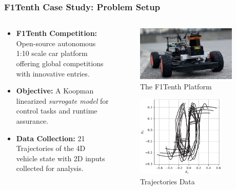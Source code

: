 \documentclass[shortpres,aspectratio=43]{beamer}
\begin{document}
\begin{frame}
\frametitle{F1Tenth Case Study: Problem Setup}
\begin{columns}
	\begin{column}{0.5\textwidth}
	\begin{itemize}
	    \item<1-> \textbf{F1Tenth Competition:} Open-source autonomous 1:10 scale car platform offering global competitions with innovative entries.
	    \item<3-> \textbf{Objective:} A Koopman linearized \textit{surrogate model} for control tasks and runtime assurance.
	    \item<4-> \textbf{Data Collection:} 21 Trajectories of the 4D vehicle state with 2D inputs collected for analysis.
	\end{itemize}
	\vspace{50pt}
	\end{column}
	\begin{column}{0.4\textwidth}
		\begin{figure}
		\centering
		  \includegraphics[width=0.9\textwidth]{./img/f1tenth.png}
		  \caption{The F1Tenth Platform}
		\end{figure}
		\begin{figure}
	\centering
	  \includegraphics[width=0.8\textwidth]{./img/training.pdf} %
	  \caption{Trajectories Data}
		\end{figure}
	\end{column}
\end{columns}
\end{frame}
\end{document}
